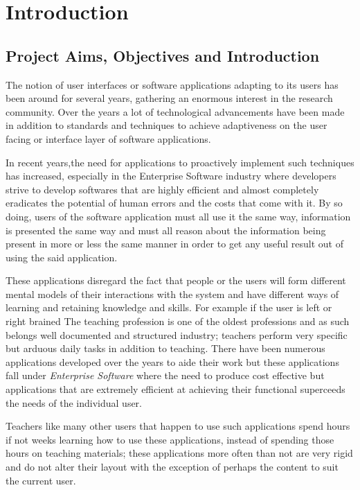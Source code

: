 \section{Introduction}
\subsection{Project Aims, Objectives and Introduction} 
The notion of user interfaces or software applications adapting to its users has been around for several years, gathering an enormous interest in the research community. Over the years a lot of technological advancements have been made in addition to standards and techniques to achieve adaptiveness on the user facing or interface layer of software applications.

In recent years,the need for applications to proactively implement such techniques has increased, especially in the Enterprise Software industry where developers strive to develop softwares that are highly efficient and almost completely eradicates the potential of human errors and the costs that come with it. By so doing, users of the software application must all use it the same way, information is presented the same way and must all reason about the information being present in more or less the same manner in order to get any useful result out of using the said application.

These applications disregard the fact that people or the users will form different mental models of their interactions with the system and have different ways of learning and retaining knowledge and skills. For example if the user is left or right brained \cite{gazzaniga1967split}
The teaching profession is one of the oldest professions and as such belongs well documented and structured industry; teachers perform very specific but arduous daily tasks in addition to teaching. There have been numerous applications developed over the years to aide their work but these applications fall under \emph{Enterprise Software} where the need to produce cost effective but applications that are extremely efficient at achieving their functional superceeds the needs of the individual user.

Teachers like many other users that happen to use such applications spend hours if not weeks learning how to use these applications, instead of spending those hours on teaching materials; these applications more often than not are very rigid and do not alter their layout with the exception of perhaps the content to suit the current user.

